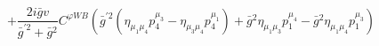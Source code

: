 %
\begin{dmath*}
%
  +  \frac{2 i {\bar g}{} v}{{\bar g}^{\prime 2} + {\bar g}{}^2}C^{ \varphi  WB} \left({\bar g}^{\prime 2} \left(\eta_{\mu_1 \mu_4} p_4^{\mu_3} - \eta_{\mu_3 \mu_4} p_4^{\mu_1}\right) + {\bar g}{}^2 \eta_{\mu_1 \mu_3} p_1^{\mu_4} - {\bar g}{}^2 \eta_{\mu_1 \mu_4} p_1^{\mu_3}\right)
%
\end{dmath*}
%
